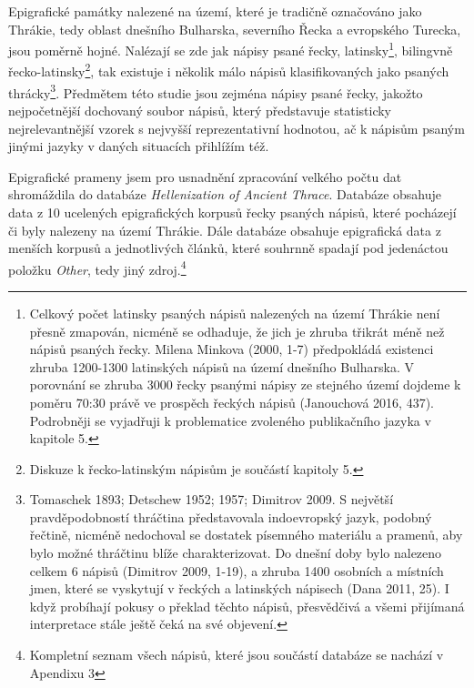 Epigrafické památky nalezené na území, které je tradičně označováno jako Thrákie, tedy oblast dnešního Bulharska, severního Řecka a evropského Turecka, jsou poměrně hojné. Nalézají se zde jak nápisy psané řecky, latinsky\footnote{Celkový počet latinsky psaných nápisů nalezených na území Thrákie není přesně zmapován, nicméně se odhaduje, že jich je zhruba třikrát méně než nápisů psaných řecky. Milena Minkova (2000, 1-7) předpokládá existenci zhruba 1200-1300 latinských nápisů na území dnešního Bulharska. V porovnání se zhruba 3000 řecky psanými nápisy ze stejného území dojdeme k poměru 70:30 právě ve prospěch řeckých nápisů (Janouchová 2016, 437). Podrobněji se vyjadřuji k problematice zvoleného publikačního jazyka v kapitole 5.}, bilingvně řecko-latinsky\footnote{Diskuze k řecko-latinským nápisům je součástí kapitoly 5.}, tak existuje i několik málo nápisů klasifikovaných jako psaných thrácky\footnote{Tomaschek 1893; Detschew 1952; 1957; Dimitrov 2009. S největší pravděpodobností thráčtina představovala indoevropský jazyk, podobný řečtině, nicméně nedochoval se dostatek písemného materiálu a pramenů, aby bylo možné thráčtinu blíže charakterizovat. Do dnešní doby bylo nalezeno celkem 6 nápisů (Dimitrov 2009, 1-19), a zhruba 1400 osobních a místních jmen, které se vyskytují v řeckých a latinských nápisech (Dana 2011, 25). I když probíhají pokusy o překlad těchto nápisů, přesvědčivá a všemi přijímaná interpretace stále ještě čeká na své objevení.}. Předmětem této studie jsou zejména nápisy psané řecky, jakožto nejpočetnější dochovaný soubor nápisů, který představuje statisticky nejrelevantnější vzorek s nejvyšší reprezentativní hodnotou, ač k nápisům psaným jinými jazyky v daných situacích přihlížím též.

Epigrafické prameny jsem pro usnadnění zpracování velkého počtu dat shromáždila do databáze {\em Hellenization of Ancient Thrace}. Databáze obsahuje data z 10 ucelených epigrafických korpusů řecky psaných nápisů, které pocházejí či byly nalezeny na území Thrákie. Dále databáze obsahuje epigrafická data z menších korpusů a jednotlivých článků, které souhrnně spadají pod jedenáctou položku {\em Other}, tedy jiný zdroj.\footnote{Kompletní seznam všech nápisů, které jsou součástí databáze se nachází v Apendixu 3}

